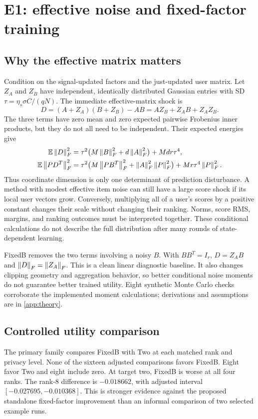 \section{E1: effective noise and fixed-factor training}
\label{sec:e1}
\subsection{Why the effective matrix matters}
Condition on the signal-updated factors and the just-updated user matrix.
Let $Z_A$ and $Z_B$ have independent, identically distributed Gaussian entries
with SD $\tau=\eta_s\sigma C/(qN)$. The immediate effective-matrix shock is
\begin{equation}
 D=(A+Z_A)(B+Z_B)-AB=AZ_B+Z_AB+Z_AZ_B.
 \label{eq:productshock}
\end{equation}
The three terms have zero mean and zero expected pairwise Frobenius inner
products, but they do not all need to be independent. Their expected energies
give
\begin{align}
 \mathbb{E}\left\lVert D\right\rVert_F^2
 &=\tau^2\bigl(M\left\lVert B\right\rVert_F^2+d\left\lVert A\right\rVert_F^2\bigr)+Mdr\tau^4,
 \label{eq:qmoment}\\
 \mathbb{E}\left\lVert PD^T\right\rVert_F^2
 &=\tau^2\bigl(M\left\lVert PB^T\right\rVert_F^2+\left\lVert A\right\rVert_F^2\left\lVert P\right\rVert_F^2\bigr)
   +Mr\tau^4\left\lVert P\right\rVert_F^2.
 \label{eq:smoment}
\end{align}
Thus coordinate dimension is only one determinant of prediction disturbance.
A method with modest effective item noise can still have a large score shock
if its local user vectors grow. Conversely, multiplying all of a user's
scores by a positive constant changes their scale without changing their
ranking. Norms, score RMS, margins, and ranking outcomes must be interpreted
together. These conditional calculations do not describe the full distribution
after many rounds of state-dependent learning.

FixedB removes the two terms involving a noisy $B$. With $BB^T=I_r$,
$D=Z_AB$ and $\left\lVert D\right\rVert_F=\left\lVert Z_A\right\rVert_F$. This is a clean linear diagnostic
baseline. It also changes clipping geometry and aggregation behavior, so
better conditional noise moments do not guarantee better trained utility.
Eight synthetic Monte Carlo checks corroborate the implemented moment
calculations; derivations and assumptions are in \cref{app:theory}.

\subsection{Controlled utility comparison}

The primary family compares FixedB with Two at each matched rank and privacy
level. None of the sixteen adjusted comparisons favors FixedB. Eight favor
Two and eight include zero. At target two, FixedB is worse at all four ranks.
The rank-8 difference is $-0.018662$, with adjusted interval
$[-0.027695,-0.010368]$. This is stronger evidence against the proposed
standalone fixed-factor improvement than an informal comparison of two
selected example runs.

